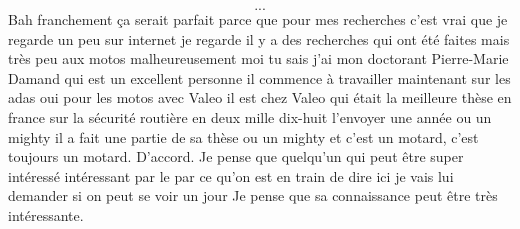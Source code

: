\[...\]
\ifconfidentiel
Bah franchement ça serait parfait parce que pour mes recherches c'est vrai que je regarde un peu sur internet je regarde il y a des recherches qui ont été faites mais très peu aux motos malheureusement moi tu sais j'ai mon doctorant Pierre-Marie Damand qui est un excellent personne il commence à travailler maintenant sur les adas oui pour les motos avec Valeo il est chez Valeo qui était la meilleure thèse en france sur la sécurité routière en deux mille dix-huit l'envoyer une année ou un mighty il a fait une partie de sa thèse ou un mighty et c'est un motard, c'est toujours un motard. D'accord. Je pense que quelqu'un qui peut être super intéressé intéressant par le par ce qu'on est en train de dire ici je vais lui demander si on peut se voir un jour Je pense que sa connaissance peut être très intéressante.
\fi